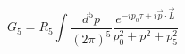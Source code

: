 \begin{equation}
G_5=R_5 \int \frac{d^5p}{(2\pi)^5}\frac{e^{-ip_0\tau 
+i\vec p \cdot \vec L}}{p_0^2+p^2+p_5^2}
\end{equation}

